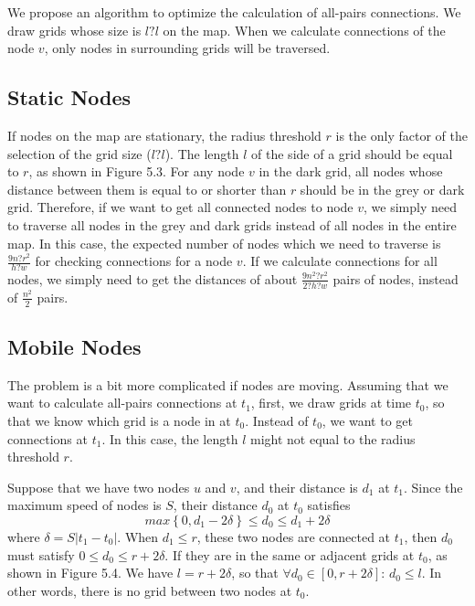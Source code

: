 \noindent We propose an algorithm to optimize the calculation of all-pairs connections. We draw grids whose size is $l\mathrm{?}l$ on the map. When we calculate connections of the node $v$, only nodes in surrounding grids will be traversed.


\subsection{ Static Nodes}

\noindent If nodes on the map are stationary, the radius threshold $r$ is the only factor of the selection of the grid size ($l\mathrm{?}l$). The length $l$ of the side of a grid should be equal to $r$, as shown in Figure 5.3. For any node $v$ in the dark grid, all nodes whose distance between them is equal to or shorter than $r$ should be in the grey or dark grid. Therefore, if we want to get all connected nodes to node $v$, we simply need to traverse all nodes in the grey and dark grids instead of all nodes in the entire map. In this case, the expected number of nodes which we need to traverse is $\frac{9n\mathrm{?}r^2}{h\mathrm{?}w}$ for checking connections for a node $v$. If we calculate connections for all nodes, we simply need to get the distances of about $\frac{9n^2\mathrm{?}r^2}{2\mathrm{?}h\mathrm{?}w}$ pairs of nodes, instead of $\frac{n^2}{2}$ pairs.


\subsection{ Mobile Nodes}

\noindent The problem is a bit more complicated if nodes are moving. Assuming that we want to calculate all-pairs connections at $t_1$, first, we draw grids at time $t_0$, so that we know which grid is a node in at $t_0$. Instead of $t_0$, we want to get connections at $t_1$. In this case, the length $l$ might not equal to the radius threshold $r$.

\noindent Suppose that we have two nodes $u$ and $v$, and their distance is $d_1$ at $t_1$. Since the maximum speed of nodes is $S$, their distance $d_0$ at $t_0$ satisfies
\[max\left\{0,d_1-2\delta \right\}\le d_0\le d_1+2\delta \] 
where $\delta =S\left|t_1-t_0\right|$. When $d_1\le r$, these two nodes are connected at $t_1$, then $d_0$ must satisfy $0\le d_0\le r+2\delta $. If they are in the same or adjacent grids at $t_0$, as shown in Figure 5.4. We have $l=r+2\delta $, so that $\mathrm{\forall }d_0\in \left[0,r+2\delta \right]$: $d_0\le l$. In other words, there is no grid between two nodes at $t_0$. 


